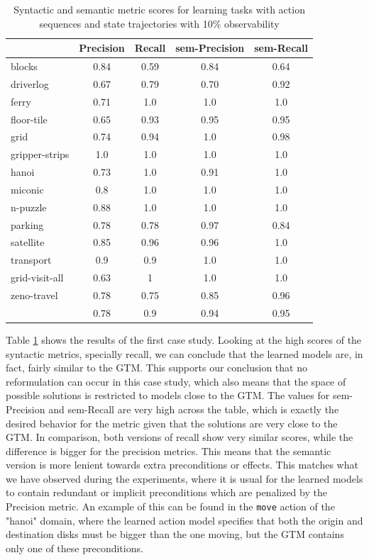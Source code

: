 \begin{table}[hbt!]
	\begin{center}		
		\begin{tabular}{l|c|c|c|c|}		
			& {\bf Precision} & {\bf Recall} & {\bf sem-Precision} & {\bf sem-Recall} \\
			\hline
			blocks & 0.84 & 0.59 & 0.84 & 0.64 \\
			driverlog & 0.67 & 0.79 & 0.70 & 0.92 \\
			ferry & 0.71 & 1.0 & 1.0 & 1.0 \\
			floor-tile & 0.65 & 0.93 & 0.95 & 0.95 \\
			grid & 0.74 & 0.94 & 1.0 & 0.98 \\
			gripper-strips & 1.0 & 1.0 & 1.0 & 1.0 \\
			hanoi & 0.73 & 1.0 & 0.91 & 1.0 \\
			miconic & 0.8 & 1.0	& 1.0 & 1.0 \\
			n-puzzle & 0.88 & 1.0 & 1.0 & 1.0 \\
			parking & 0.78 & 0.78 & 0.97 & 0.84 \\
			satellite & 0.85 & 0.96 & 0.96 & 1.0 \\
			transport & 0.9 & 0.9 & 1.0 & 1.0 \\
			grid-visit-all & 0.63 & 1 & 1.0 & 1.0 \\
			zeno-travel & 0.78 & 0.75 & 0.85 & 0.96 \\
			\hline
			& 0.78 & 0.9 & 0.94 & 0.95
		\end{tabular}
	\end{center}
	\caption{\small Syntactic and semantic metric scores for learning tasks with \FO action sequences and \PO state trajectories with 10\% observability}
	\label{tab:metric_comparison_100_10}
\end{table}

Table \ref{tab:metric_comparison_100_10} shows the results of the first case study. Looking at the high scores of the syntactic metrics, specially recall, we can conclude that the learned models are, in fact, fairly similar to the GTM. This supports our conclusion that no reformulation can occur in this case study, which also means that the space of possible solutions is restricted to models close to the GTM. The values for sem-Precision and sem-Recall are very high across the table, which is exactly the desired behavior for the metric given that the solutions are very close to the GTM. In comparison, both versions of recall show very similar scores, while the difference is bigger for the precision metrics. This means that the semantic version is more lenient towards extra preconditions or effects. This matches what we have observed during the experiments, where it is usual for the learned models to contain redundant or implicit preconditions which are penalized by the Precision metric. An example of this can be found in the {\tt move} action of the "hanoi" domain, where the learned action model specifies that both the origin and destination disks must be bigger than the one moving, but the GTM contains only one of these preconditions.

